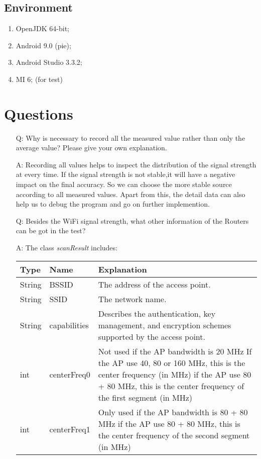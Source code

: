 \documentclass[12pt]{report}
\begin{document}
\subsection{Environment}
\begin{enumerate}
	\item OpenJDK 64-bit;
	\item Android 9.0 (pie);
	\item Android Studio 3.3.2;
	\item MI 6; (for test)
\end{enumerate}

\section{Questions}
\begin{enumerate}
	\item[Q:]  Why is necessary to record all the measured value rather than only the
	average value? Please give your own explanation.
	\item[A:]  Recording all values helps to inspect the distribution of the signal strength at every time. If the signal strength is not stable,it will have a negative impact on the final accuracy. So we can choose the more stable source according to all measured values. Apart from this, the detail data can also help us to debug the program and go on further implemention.
	\item[Q:]  Besides the WiFi signal strength, what other information of the Routers can be got in the test?
	\item[A:] The class \textit{scanResult} includes:\\
	\begin{tabular}{p{3cm}p{4cm}p{7cm}}
		\toprule
		Type & Name & Explanation \\
		\midrule
		String & BSSID & The address of the access point. \\
		String & SSID & The network name. \\
		String & capabilities & Describes the authentication, key management, and encryption schemes supported by the access point. \\
		int & centerFreq0 & Not used if the AP bandwidth is 20 MHz If the AP use 40, 80 or 160 MHz, this is the center frequency (in MHz) if the AP use 80 + 80 MHz, this is the center frequency of the first segment (in MHz) \\
		int & centerFreq1 & Only used if the AP bandwidth is 80 + 80 MHz if the AP use 80 + 80 MHz, this is the center frequency of the second segment (in MHz) \\

\end{tabular}
\end{enumerate}
\end{document}
